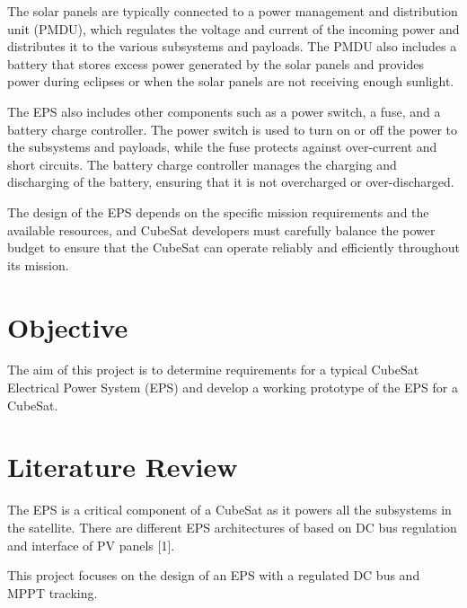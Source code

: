 
The solar panels are typically connected to a power management and distribution unit (PMDU), which regulates the voltage and current of the incoming power and distributes it to the various subsystems and payloads. The PMDU also includes a battery that stores excess power generated by the solar panels and provides power during eclipses or when the solar panels are not receiving enough sunlight.

The EPS also includes other components such as a power switch, a fuse, and a battery charge controller. The power switch is used to turn on or off the power to the subsystems and payloads, while the fuse protects against over-current and short circuits. The battery charge controller manages the charging and discharging of the battery, ensuring that it is not overcharged or over-discharged.

The design of the EPS depends on the specific mission requirements and the available resources, and CubeSat developers must carefully balance the power budget to ensure that the CubeSat can operate reliably and efficiently throughout its mission.

\section{Objective}

The aim of this project is to determine requirements for a typical CubeSat Electrical Power System (EPS) and develop a working prototype of the EPS for a CubeSat.

\section{Literature Review}
\justifying
The EPS is a critical component of a CubeSat as it powers all the subsystems in the satellite. There are different EPS architectures of based on DC bus regulation and interface of PV panels [1].

 This project focuses on the design of an EPS with a regulated DC bus and MPPT tracking.
%
\\

